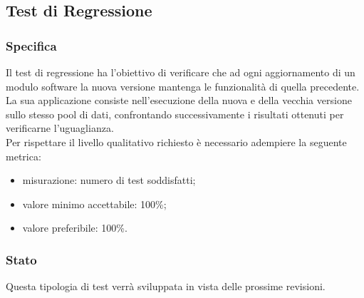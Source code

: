 \subsection{Test di Regressione}

	\subsubsection{Specifica}
		Il test di regressione ha l'obiettivo di verificare che ad ogni aggiornamento di un modulo software la nuova versione mantenga le funzionalità di quella precedente.
		La sua applicazione consiste nell'esecuzione della nuova e della vecchia versione sullo stesso pool di dati, confrontando successivamente i risultati ottenuti per verificarne l'uguaglianza.\\
		Per rispettare il livello qualitativo richiesto è necessario adempiere la seguente metrica:
		\begin{itemize}
			\item misurazione: numero di test soddisfatti;
			\item valore minimo accettabile: 100\%;
			\item valore preferibile: 100\%.
		\end{itemize}
	
	
	\subsubsection{Stato}
		Questa tipologia di test verrà sviluppata in vista delle prossime revisioni.